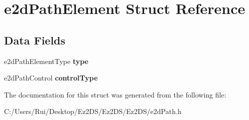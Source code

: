 \hypertarget{structe2d_path_element}{\section{e2d\-Path\-Element Struct Reference}
\label{structe2d_path_element}
}
\subsection*{Data Fields}
\begin{DoxyCompactItemize}
\item 
\hypertarget{structe2d_path_element_acb2ed01d1856b82777314d8eb8f66b01}{e2d\-Path\-Element\-Type {\bfseries type}}\label{structe2d_path_element_acb2ed01d1856b82777314d8eb8f66b01}

\item 
\hypertarget{structe2d_path_element_a88af317c0c6d0deb1aacb6cc1acd441d}{e2d\-Path\-Control {\bfseries control\-Type}}\label{structe2d_path_element_a88af317c0c6d0deb1aacb6cc1acd441d}

\end{DoxyCompactItemize}


The documentation for this struct was generated from the following file\-:\begin{DoxyCompactItemize}
\item 
C\-:/\-Users/\-Rui/\-Desktop/\-Ez2\-D\-S/\-Ez2\-D\-S/\-Ez2\-D\-S/e2d\-Path.\-h\end{DoxyCompactItemize}
